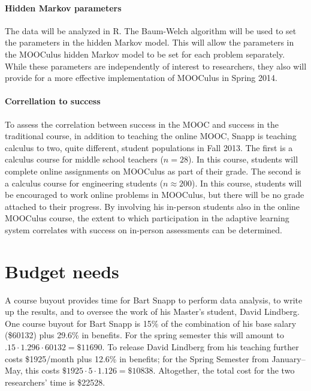 \documentclass[12pt]{article}
\begin{document}
\paragraph{Hidden Markov parameters}

The data will be analyzed in R. The Baum-Welch algorithm will be used
to set the parameters in the hidden Markov model. This will allow the
parameters in the MOOCulus hidden Markov model to be set for each
problem separately. While these parameters are independently of
interest to researchers, they also will provide for a more effective
implementation of MOOCulus in Spring 2014.

\paragraph{Correllation to success}

To assess the correlation between success in the MOOC and success in
the traditional course, in addition to teaching the online MOOC, Snapp
is teaching calculus to two, quite different, student populations in
Fall 2013.  The first is a calculus course for middle school teachers
($n=28$). In this course, students will complete online assignments on
MOOCulus as part of their grade.  The second is a calculus course for
engineering students ($n\approx 200$).  In this course, students will
be encouraged to work online problems in MOOCulus, but there will be
no grade attached to their progress.  By involving his in-person
students also in the online MOOCulus course, the extent to which
participation in the adaptive learning system correlates with success
on in-person assessments can be determined.




\section{Budget needs}
A course buyout provides time for Bart Snapp to perform data analysis,
to write up the results, and to oversee the work of his Master's
student, David Lindberg.  One course buyout for Bart Snapp is 15\% of
the combination of his base salary (\$60132) plus 29.6\% in
benefits. For the spring semester this will amount to $.15 \cdot
1.296\cdot 60132=\$11690$.  To release David Lindberg from his
teaching further costs \$1925/month plus 12.6\% in benefits; for the
Spring Semester from January--May, this costs $\$1925 \cdot 5 \cdot
1.126 = \$10838$.  Altogether, the total cost for the two researchers'
time is \$22528.

\pagebreak
\printbibliography
\end{document}
